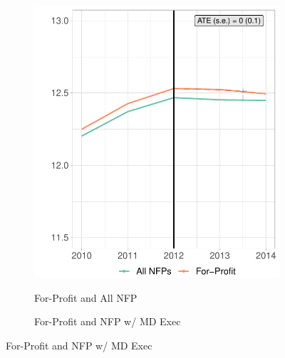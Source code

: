\documentclass[12pt]{article}
\begin{document}
     \begin{figure}
     \caption{Mortality Rate Synthetic Difference in Differences Results}
     \centering
          \begin{subfigure}[b]{0.45\textwidth}
         \centering
         \caption{For-Profit and All NFP}
         \includegraphics[width=\textwidth]{Objects/mort_fp_nfp_synth_graph.pdf}
         \label{fig:mort_synth_plota}
     \end{subfigure}%
     \hfill
     \begin{subfigure}[b]{0.45\textwidth}
         \centering
         \caption{For-Profit and NFP w/ MD Exec}

\end{subfigure}
\end{figure}
\end{document}
